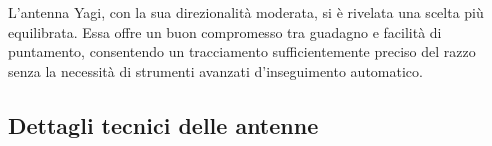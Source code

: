 \documentclass[12pt,a4paper,twoside]{book}
\begin{document}
L'antenna Yagi, con la sua direzionalità moderata, si è rivelata una scelta più
equilibrata. Essa offre un buon compromesso tra guadagno e facilità di puntamento,
consentendo un tracciamento sufficientemente preciso del razzo senza la necessità
di strumenti avanzati d'inseguimento automatico.

\subsection*{Dettagli tecnici delle antenne}

\begin{table}[H]
    \centering
    \caption{Specifiche tecniche dell'antenna omnidirezionale e dell'antenna Yagi.}
    \label{tab:antenne_confronto}
\end{table}
\end{document}
